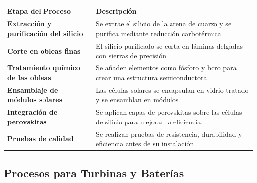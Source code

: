 \documentclass[letterpaper, 12pt]{article}
\begin{document}
\begin{table}[H]
      \begin{tabularx}{\linewidth}{>{\arraybackslash}X>{\arraybackslash}X}
            \hline
            \textbf{Etapa del Proceso}     & \textbf{Descripción}                                         \\\hline
            \textbf{Extracción y purificación
            del silicio }                  & Se extrae el silicio de la arena de cuarzo y se purifica
            mediante reducción carbotérmica                                                               \\\hline
            \textbf{Corte en obleas finas} & El silicio purificado se corta en láminas delgadas con
            sierras de precisión                                                                          \\\hline
            \textbf{Tratamiento químico de
            las obleas}                    & Se añaden elementos como fósforo y boro para crear una
            estructura semiconductora.                                                                    \\\hline
            \textbf{Ensamblaje de módulos
            solares}                       & Las células solares se encapsulan en vidrio tratado y se
            ensamblan en módulos                                                                          \\\hline
            \textbf{Integración de
            perovskitas}                   & Se aplican capas de perovskitas sobre las células de silicio
            para mejorar la eficiencia.                                                                   \\\hline
            \textbf{Pruebas de calidad}    & Se realizan pruebas de resistencia, durabilidad y eficiencia
            antes de su instalación                                                                       \\\hline
      \end{tabularx}
\end{table}

\subsection{Procesos para Turbinas y Baterías}
\end{document}
